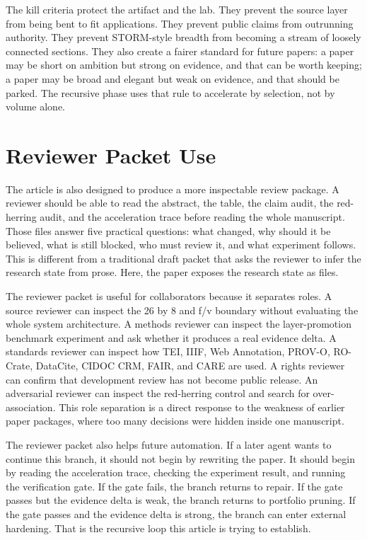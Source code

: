 \documentclass[sigconf,nonacm]{acmart}
\begin{document}
The kill criteria protect the artifact and the lab. They prevent the source
layer from being bent to fit applications. They prevent public claims from
outrunning authority. They prevent STORM-style breadth from becoming a stream of
loosely connected sections. They also create a fairer standard for future
papers: a paper may be short on ambition but strong on evidence, and that can be
worth keeping; a paper may be broad and elegant but weak on evidence, and that
should be parked. The recursive phase uses that rule to accelerate by selection,
not by volume alone.

\section{Reviewer Packet Use}
The article is also designed to produce a more inspectable review package. A reviewer
should be able to read the abstract, the table, the claim audit, the red-herring
audit, and the acceleration trace before reading the whole manuscript. Those
files answer five practical questions: what changed, why should it be believed,
what is still blocked, who must review it, and what experiment follows. This is
different from a traditional draft packet that asks the reviewer to infer the
research state from prose. Here, the paper exposes the research state as files.

The reviewer packet is useful for collaborators because it separates roles. A
source reviewer can inspect the 26 by 8 and f/v boundary without evaluating the
whole system architecture. A methods reviewer can inspect the layer-promotion benchmark experiment and ask
whether it produces a real evidence delta. A standards reviewer can inspect how
TEI, IIIF, Web Annotation, PROV-O, RO-Crate, DataCite, CIDOC CRM, FAIR, and CARE
are used. A rights reviewer can confirm that development review has not become
public release. An adversarial reviewer can inspect the red-herring control and
search for over-association. This role separation is a direct response to the
weakness of earlier paper packages, where too many decisions were hidden inside
one manuscript.

The reviewer packet also helps future automation. If a later agent wants to
continue this branch, it should not begin by rewriting the paper. It should
begin by reading the acceleration trace, checking the experiment result, and
running the verification gate. If the gate fails, the branch returns to repair. If
the gate passes but the evidence delta is weak, the branch returns to
portfolio pruning. If the gate passes and the evidence delta is strong, the
branch can enter external hardening. That is the recursive loop this article is
trying to establish.
\end{document}
